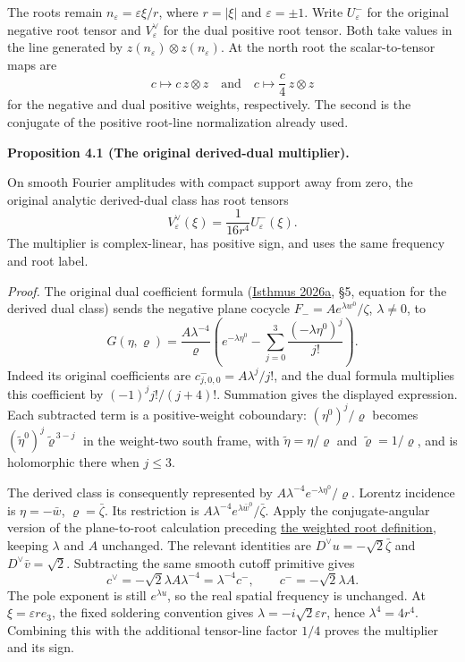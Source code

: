 \documentclass[
  english,
  11pt,
  reqno]{amsart}
\makeatletter
\newcommand{\pandocstatementheading}[1]{%
  \par\if@nobreak\else
    \addpenalty{\@beginparpenalty}%
    \addvspace{.5\baselineskip plus .2\baselineskip minus .2\baselineskip}%
  \fi
  {\normalfont\bfseries #1\par}%
  \nobreak\@afterindenttrue\@afterheading
}
\makeatother
\begin{document}
The roots remain \(n_\varepsilon=\varepsilon\xi/r\), where \(r=|\xi|\)
and \(\varepsilon=\pm1\). Write \(U^-_\varepsilon\) for the original
negative root tensor and \(V^\vee_\varepsilon\) for the dual positive
root tensor. Both take values in the line generated by
\(z(n_\varepsilon)\otimes z(n_\varepsilon)\). At the north root the
scalar-to-tensor maps are%
 \[
c\longmapsto c\,z\otimes z
\quad\text{and}\quad
c\longmapsto \frac c4\,z\otimes z
\] for the negative and dual positive weights, respectively. The second
is the conjugate of the positive root-line normalization already used.

\pandocstatementheading{\leavevmode{}\label{prop:online-original-negative-dual-calibration}Proposition 4.1 (The original derived-dual multiplier).}

On smooth Fourier amplitudes with compact support away from zero, the
original analytic derived-dual class has root tensors%
 \[
V^\vee_\varepsilon(\xi)=\frac1{16r^4}U^-_\varepsilon(\xi).
\] The multiplier is complex-linear, has positive sign, and uses the
same frequency and root label.

\emph{Proof.} The original dual coefficient formula
(\hyperref[ref-IsthmusLocal2026]{Isthmus 2026a}, §5, equation for the
derived dual class) sends the negative plane cocycle
\(F_-=A e^{\lambda w^0}/\zeta\), \(\lambda\ne0\), to%
 \[
G(\eta,\varrho)=\frac{A\lambda^{-4}}{\varrho}
\left(e^{-\lambda\eta^0}
-\sum_{j=0}^{3}\frac{(-\lambda\eta^0)^j}{j!}\right).
\] Indeed its original coefficients are \(c^-_{j,0,0}=A\lambda^j/j!\),
and the dual formula multiplies this coefficient by
\((-1)^j j!/(j+4)!\). Summation gives the displayed expression. Each
subtracted term is a positive-weight coboundary: \((\eta^0)^j/\varrho\)
becomes \((\tilde\eta^0)^j\tilde\varrho^{\,3-j}\) in the weight-two
south frame, with \(\tilde\eta=\eta/\varrho\) and
\(\tilde\varrho=1/\varrho\), and is holomorphic there when \(j\le3\).

The derived class is consequently represented by
\(A\lambda^{-4}e^{-\lambda\eta^0}/\varrho\). Lorentz incidence is
\(\eta=-\bar w\), \(\varrho=\bar\zeta\). Its restriction is
\(A\lambda^{-4}e^{\lambda\bar w^0}/\bar\zeta\). Apply the
conjugate-angular version of the plane-to-root calculation preceding
\hyperref[def:online-weighted-root-domain]{the weighted root
definition}, keeping \(\lambda\) and \(A\) unchanged. The relevant
identities are \(D^\vee u=-\sqrt2\bar\zeta\) and
\(D^\vee\bar v=\sqrt2\). Subtracting the same smooth cutoff primitive
gives%
\[
c^\vee=-\sqrt2\lambda A\lambda^{-4}
=\lambda^{-4}c^-,
\qquad c^-=-\sqrt2\lambda A.
\] The pole exponent is still \(e^{\lambda u}\), so the real spatial
frequency is unchanged. At \(\xi=\varepsilon r e_3\), the fixed
soldering convention gives \(\lambda=-i\sqrt2\varepsilon r\), hence
\(\lambda^4=4r^4\). Combining this with the additional tensor-line
factor \(1/4\) proves the multiplier and its sign.
\end{document}
